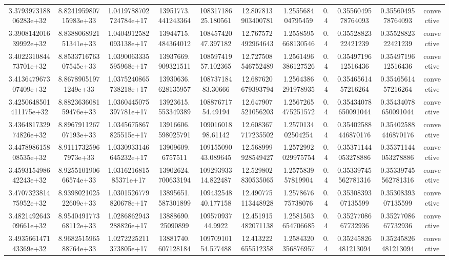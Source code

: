 \begin{table}
\begin{tabular}{ccccccccccc}
3.379397318806283e+32 & 8.824195980715983e+33 & 1.0419788702724784e+17 & 13951773.441243364 & 10831718625.180561 & 12.807813903400781 & 1.255568404795459 & 0.4 & 0.3556049578764093 & 0.3556049578764093 & convective \\
3.390814201639992e+32 & 8.838806892151341e+33 & 1.0404912582093138e+17 & 13944715.484364012 & 10845742047.397182 & 12.767572492964643 & 1.2558595668130546 & 0.4 & 0.3552882322421239 & 0.3552882322421239 & convective \\
3.402231084473701e+32 & 8.853371676307545e+33 & 1.0390063335595968e+17 & 13937669.909321511 & 10859741957.102365 & 12.727508546752489 & 1.2561496386127526 & 0.4 & 0.3549719612516436 & 0.3549719612516436 & convective \\
3.413647967307409e+32 & 8.86789051971249e+33 & 1.0375240865738218e+17 & 13930636.628135957 & 10873718483.30666 & 12.687620679393794 & 1.2564386291978935 & 0.4 & 0.3546561457216264 & 0.3546561457216264 & convective \\
3.4250648501411175e+32 & 8.882363608159476e+33 & 1.0360445075397781e+17 & 13923615.553349389 & 10887671754.49194 & 12.647907521056203 & 1.2567265475251572 & 0.4 & 0.35434078650091044 & 0.35434078650091044 & convective \\
3.436481732974826e+32 & 8.896791126707193e+33 & 1.0345675867825515e+17 & 13916606.598025791 & 10901601898.61142 & 12.608367717235502 & 1.257013402504254 & 0.4 & 0.35402588446870176 & 0.35402588446870176 & convective \\
3.447898615808535e+32 & 8.91117325967973e+33 & 1.0330933146645232e+17 & 13909609.6757511 & 10915509043.089645 & 12.568999928549427 & 1.2572992029975754 & 0.4 & 0.35371144053278886 & 0.35371144053278886 & convective \\
3.459315498642243e+32 & 8.925510190666574e+33 & 1.031621681585371e+17 & 13902624.700633194 & 10929393314.822487 & 12.529802830535065 & 1.257583957819904 & 0.4 & 0.35339745562781316 & 0.35339745562781316 & convective \\
3.470732381475952e+32 & 8.939802102522609e+33 & 1.0301526779820678e+17 & 13895651.587301899 & 10943254840.177158 & 12.490775113448928 & 1.257867675738076 & 0.4 & 0.3530839307135599 & 0.3530839307135599 & convective \\
3.482149264309661e+32 & 8.954049177368112e+33 & 1.0286862943288826e+17 & 13888690.25090899 & 10957093744.9922 & 12.451915482071138 & 1.2581503654706685 & 0.4 & 0.3527708667732936 & 0.3527708667732936 & convective \\
3.493566147143369e+32 & 8.968251596588764e+33 & 1.0272225211373805e+17 & 13881740.607128184 & 10970910154.577488 & 12.413222655512358 & 1.2584320356876957 & 0.4 & 0.35245826481213094 & 0.35245826481213094 & convective \\

\end{tabular}
\end{table}
